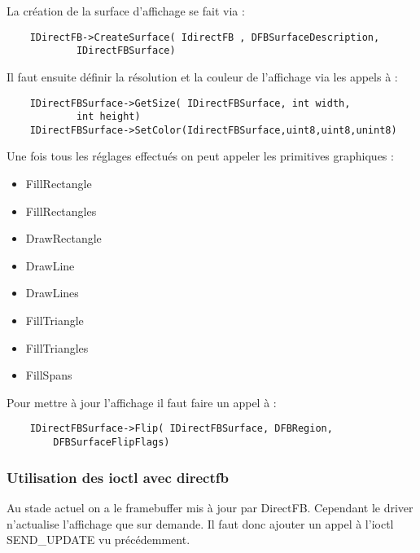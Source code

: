 La création de la surface d'affichage se fait via : 
	\begin{lstlisting}
	IDirectFB->CreateSurface( IdirectFB , DFBSurfaceDescription, 
			IDirectFBSurface)
	\end{lstlisting}

Il faut ensuite définir la résolution et la couleur de l'affichage via les appels à :
	\begin{lstlisting}
	IDirectFBSurface->GetSize( IDirectFBSurface, int width, 
			int height)
	IDirectFBSurface->SetColor(IdirectFBSurface,uint8,uint8,unint8)
	\end{lstlisting}

Une fois tous les réglages effectués on peut appeler les primitives graphiques : 
\begin{itemize}
	\item FillRectangle
	\item FillRectangles
	\item DrawRectangle
	\item DrawLine
	\item DrawLines
	\item FillTriangle
	\item FillTriangles
	\item FillSpans
\end{itemize}

Pour mettre à jour l'affichage il faut faire un appel à : 
	\begin{lstlisting}
	IDirectFBSurface->Flip( IDirectFBSurface, DFBRegion,
		DFBSurfaceFlipFlags)
	\end{lstlisting}




\subsubsection{Utilisation des ioctl avec directfb}

Au stade actuel on a le framebuffer mis à jour par DirectFB. Cependant le driver n'actualise l'affichage que sur demande.
Il faut donc ajouter un appel à l'ioctl SEND_UPDATE vu précédemment.

